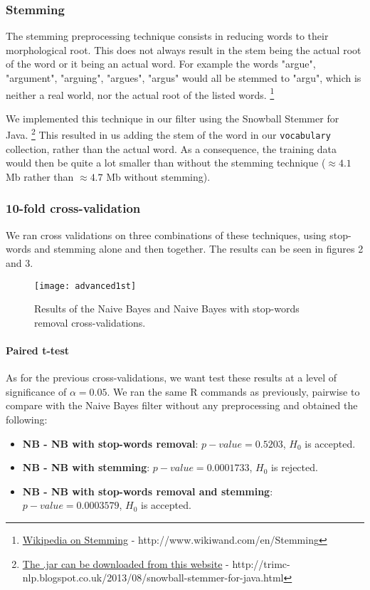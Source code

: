 \documentclass[12pt,a4paper]{report}
\begin{document}
\subsubsection{Stemming} 
The stemming preprocessing technique consists in reducing words to their morphological root. This does not always result in the stem being the actual root of the word or it being an actual word. For example the words "argue", "argument", "arguing", "argues", "argus" would all be stemmed to "argu", which is neither a real world, nor the actual root of the listed words.
\footnote{\href{http://www.wikiwand.com/en/Stemming}{Wikipedia on Stemming} -  http://www.wikiwand.com/en/Stemming} 

We implemented this technique in our filter using the Snowball Stemmer for Java.
\footnote{\href{http://trimc-nlp.blogspot.co.uk/2013/08/snowball-stemmer-for-java.html}{The .jar can be downloaded from this website} -  http://trimc-nlp.blogspot.co.uk/2013/08/snowball-stemmer-for-java.html}
This resulted in us adding the stem of the word in our \texttt{vocabulary} collection, rather than the actual word. As a consequence, the training data would then be quite a lot smaller than without the stemming technique ($\approx 4.1$ Mb rather than $\approx 4.7$ Mb without stemming).

\subsubsection{10-fold cross-validation} 

We ran cross validations on three combinations of these techniques, using stop-words and stemming alone and then together. The results can be seen in figures 2 and 3.

\begin{figure}
\texttt{[image: advanced1st]}
\centering
\caption{Results of the Naive Bayes and Naive Bayes with stop-words removal cross-validations.}
\end{figure}

\paragraph*{Paired t-test}
As for the previous cross-validations, we want test these results at a level of significance of $\alpha = 0.05$. We ran the same R commands as previously, pairwise to compare with the Naive Bayes filter without any preprocessing and obtained the following:
\begin{itemize}
\item \textbf{NB - NB with stop-words removal}: $p-value = 0.5203$, $H_0$ is accepted.
\item \textbf{NB - NB with stemming}: $p-value = 0.0001733$, $H_0$ is rejected.
\item \textbf{NB - NB with stop-words removal and stemming}: \linebreak $p-value = 0.0003579$, $H_0$ is accepted.
\end{itemize}
\end{document}
